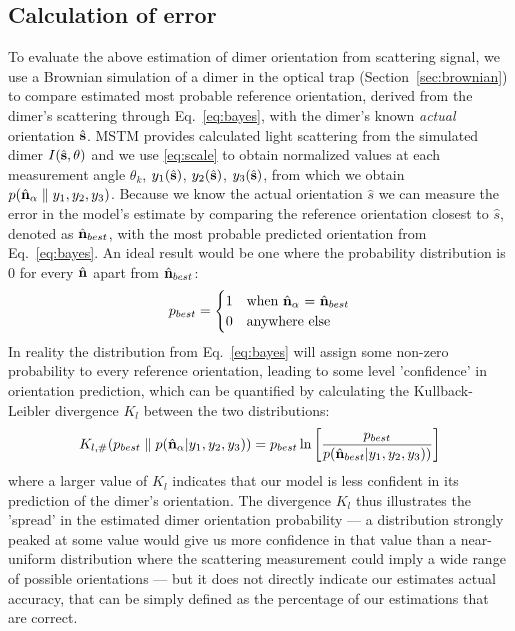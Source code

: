 \documentclass[12pt]{spieman}
\begin{document}
\begin{spacing}{1.5}
\subsection{Calculation of error}
\label{sec:divergence}
To evaluate the above estimation of dimer orientation from scattering signal, we use a Brownian simulation of a dimer in the optical trap (Section~\ref{sec:brownian}) to compare estimated most probable reference orientation, derived from the dimer's scattering through Eq.~\eqref{eq:bayes}, with the dimer's known \emph{actual} orientation $\hat{\bf s}$. MSTM provides calculated light scattering from the simulated dimer $I(\hat{\bf s}, \theta)$ and we use \eqref{eq:scale} to obtain normalized values at each measurement angle $\theta_k$,  $y_1(\hat{\bf s})$, $y_2(\hat{\bf s})$, $y_3(\hat{\bf s})$, from which we obtain $p(\hat{\bf n}_{\alpha}\parallel y_1, y_2, y_3)$. Because we know the actual orientation $\hat{s}$ we can measure the error in the model's estimate by comparing the reference orientation closest to $\hat{s}$, denoted as $\hat{\bf n}_{best}$, with the most probable predicted orientation from Eq.~\eqref{eq:bayes}. An ideal result would be one where the probability distribution is 0 for every $\hat{\bf n}$ apart from $\hat{\bf n}_{best}$:
\begin{align}
	\label{eq:best}
	p_{best} = 
	\begin{cases}
		1 & \text{when $\hat{\bf n}_\alpha$ = $\hat{\bf n}_{best}$}\\
		0 & \text{anywhere else}
	\end{cases}
\end{align}
In reality the distribution from Eq.~\eqref{eq:bayes} will assign some non-zero
probability to every reference orientation, leading to some level 'confidence' in orientation prediction, which can be quantified by calculating the Kullback-Leibler divergence $K_l$ between the two distributions:
\begin{align}
	K_{l, \#}(p_{best}\parallel p(\hat{\bf n}_\alpha| y_1, y_2, y_3))
	= p_{best}\ln \left[\frac{p_{best}}{p(\hat{\bf n}_{best}| y_1,y_2,y_3))}
	\right]
	\label{eq;kullback}
\end{align}
where a larger value of $K_l$ indicates that our model is less confident in its
prediction of the dimer's orientation. The divergence $K_l$ thus illustrates the 'spread'
in the estimated dimer orientation probability --- a distribution strongly peaked at 
some value would give us more confidence in that value than a near-uniform distribution 
where the scattering measurement could imply a wide range of possible orientations --- 
but it does not directly indicate our estimates actual accuracy, that can be simply defined as the percentage of our estimations that are correct. 


\end{spacing}
\end{document}
